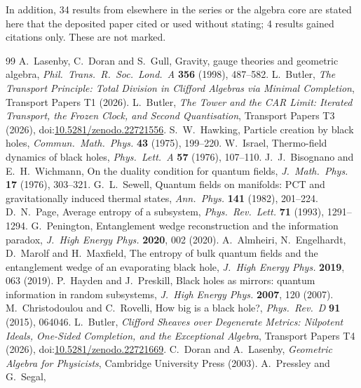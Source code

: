 \documentclass[11pt]{article}
\theoremstyle{definition}
\theoremstyle{plain}
\begin{document}
\noindent In addition, 34 results from elsewhere in the series or the algebra core are stated here that the deposited paper cited or used without stating; 4 results gained citations only. These are not marked.
\begin{thebibliography}{99}
 A.~Lasenby, C.~Doran and S.~Gull,
Gravity, gauge theories and geometric algebra,
\emph{Phil.\ Trans.\ R.\ Soc.\ Lond.\ A} \textbf{356} (1998), 487--582.
 L.~Butler,
\emph{The Transport Principle: Total Division in Clifford Algebras via Minimal Completion},
Transport Papers T1 (2026).
 L.~Butler,
\emph{The Tower and the CAR Limit: Iterated Transport, the Frozen Clock, and Second Quantisation},
Transport Papers T3 (2026), doi:\href{https://doi.org/10.5281/zenodo.22721556}{10.5281/zenodo.22721556}.
 S.~W.~Hawking,
Particle creation by black holes,
\emph{Commun.\ Math.\ Phys.} \textbf{43} (1975), 199--220.
 W.~Israel,
Thermo-field dynamics of black holes,
\emph{Phys.\ Lett.\ A} \textbf{57} (1976), 107--110.
 J.~J.~Bisognano and E.~H.~Wichmann,
On the duality condition for quantum fields,
\emph{J.\ Math.\ Phys.} \textbf{17} (1976), 303--321.
 G.~L.~Sewell,
Quantum fields on manifolds: PCT and gravitationally induced thermal states,
\emph{Ann.\ Phys.} \textbf{141} (1982), 201--224.
 D.~N.~Page,
Average entropy of a subsystem,
\emph{Phys.\ Rev.\ Lett.} \textbf{71} (1993), 1291--1294.
 G.~Penington,
Entanglement wedge reconstruction and the information paradox,
\emph{J.\ High Energy Phys.} \textbf{2020}, 002 (2020).
 A.~Almheiri, N.~Engelhardt, D.~Marolf and H.~Maxfield,
The entropy of bulk quantum fields and the entanglement wedge of an evaporating black hole,
\emph{J.\ High Energy Phys.} \textbf{2019}, 063 (2019).
 P.~Hayden and J.~Preskill,
Black holes as mirrors: quantum information in random subsystems,
\emph{J.\ High Energy Phys.} \textbf{2007}, 120 (2007).
 M.~Christodoulou and C.~Rovelli,
How big is a black hole?,
\emph{Phys.\ Rev.\ D} \textbf{91} (2015), 064046.
 L.~Butler,
\emph{Clifford Sheaves over Degenerate Metrics: Nilpotent Ideals, One-Sided Completion, and the Exceptional Algebra},
Transport Papers T4 (2026), doi:\href{https://doi.org/10.5281/zenodo.22721669}{10.5281/zenodo.22721669}.
 C.~Doran and A.~Lasenby,
\emph{Geometric Algebra for Physicists},
Cambridge University Press (2003).
 A.~Pressley and G.~Segal,

\end{thebibliography}
\end{document}

